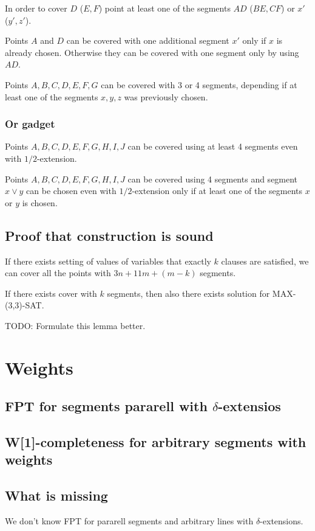\begin{lemma}
In order to cover $D$ ($E, F$) point at least one
of the segments $AD$ ($BE, CF$) or $x'$ ($y', z'$).
\end{lemma}

\begin{lemma}
Points $A$ and $D$ can be covered
with one additional segment $x'$
only if $x$ is already chosen.
Otherwise they can be covered with one segment
only by using $AD$.
\end{lemma}

\begin{lemma}
Points $A, B, C, D, E, F, G$ can be covered with 
3 or 4 segments, depending if at least one of the segments
$x, y, z$ was previously chosen.
\end{lemma}

\subsubsection{Or gadget}
\begin{lemma}
Points $A, B, C, D, E, F, G, H, I, J$ can be covered using
at least 4 segments even with $1/2$-extension.
\end{lemma}

\begin{lemma}
Points $A, B, C, D, E, F, G, H, I, J$ can be covered using
4 segments and segment $x \lor y$ can be chosen
even with $1/2$-extension
only if at least one of the segments $x$ or $y$ is chosen.
\end{lemma}

\subsection{Proof that construction is sound}
\begin{lemma}
If there exists setting of values of variables that exactly $k$
clauses are satisfied, we can cover all the points
with $3n + 11m + (m-k)$ segments.
\end{lemma}

\begin{lemma}
If there exists cover with $k$ segments,
then also there exists solution for MAX-(3,3)-SAT.

TODO: Formulate this lemma better.
\end{lemma}

\section{Weights}
\subsection{FPT for segments pararell with $\delta$-extensios}
\subsection{W[1]-completeness for arbitrary segments with weights}
\subsection{What is missing}
We don't know FPT for pararell segments
and arbitrary lines with $\delta$-extensions.
